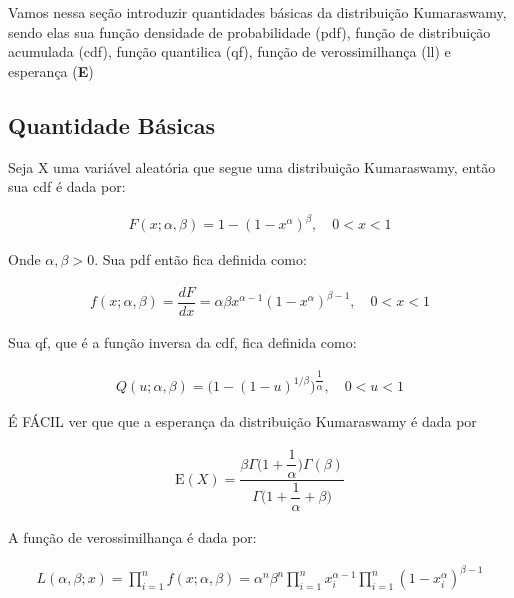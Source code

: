 \documentclass[
]{article}
\begin{document}
Vamos nessa seção introduzir quantidades básicas da distribuição
Kumaraswamy, sendo elas sua função densidade de probabilidade (pdf),
função de distribuição acumulada (cdf), função quantilica (qf), função
de verossimilhança (ll) e esperança (\textbf{E})

\subsection{Quantidade Básicas}

Seja X uma variável aleatória que segue uma distribuição Kumaraswamy,
então sua cdf é dada por:

\begin{align}
F(x;\alpha, \beta) = 1 - (1 - x^\alpha)^\beta,  \quad 0 < x< 1
\end{align}

Onde \(\alpha, \beta > 0\). Sua pdf então fica definida como:

\begin{align}
f(x;\alpha, \beta) = \dfrac{dF}{dx} =\alpha\beta x^{\alpha - 1}(1 - x^\alpha)^{\beta  - 1}, \quad 0 < x< 1
\end{align}

Sua qf, que é a função inversa da cdf, fica definida como:

\begin{align}
Q(u;\alpha, \beta) = \bigg(1 - (1 - u)^{1/\beta}\bigg)^{\dfrac{1}{\alpha}}, \quad 0<u<1
\end{align}

É FÁCIL ver que que a esperança da distribuição Kumaraswamy é dada por

\begin{align}
\text{E}(X) = \dfrac{\beta\Gamma\bigg(1 + \dfrac{1}{\alpha}\bigg)\Gamma(\beta)}{\Gamma\bigg(1 + \dfrac{1}{\alpha} + \beta\bigg)}
\end{align}

A função de verossimilhança é dada por:

\begin{align}
L(\alpha, \beta; x) = \prod_{i=1}^{n}f(x;\alpha, \beta) = \alpha^n \beta^n \prod_{i=1}^{n}x_i^{\alpha - 1}\prod_{i=1}^{n}(1-x_i^{\alpha})^{\beta-1}
\end{align}
\end{document}
